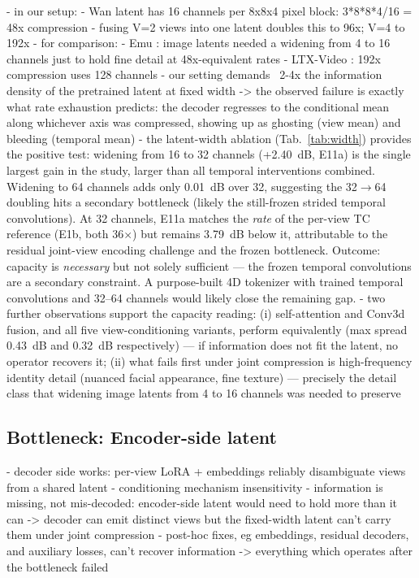 - in our setup:
    - Wan latent has 16 channels per 8x8x4 pixel block: 3*8*8*4/16 = 48x compression
    - fusing V=2 views into one latent doubles this to 96x; V=4 to 192x
- for comparison:
    - Emu \cite{dai2023emu}: image latents needed a widening from 4 to 16 channels just to hold fine detail at 48x-equivalent rates
    - LTX-Video \cite{hacohen2024ltx}: 192x compression uses 128 channels
- our setting demands ~2-4x the information density of the pretrained latent at fixed width -> the observed failure is exactly what rate exhaustion predicts: the decoder regresses to the conditional mean along whichever axis was compressed, showing up as ghosting (view mean) and bleeding (temporal mean)
- the latent-width ablation (Tab.~\ref{tab:width}) provides the positive test: widening from 16 to 32 channels (+2.40~dB, E11a) is the single largest gain in the study, larger than all temporal interventions combined. Widening to 64 channels adds only 0.01~dB over 32, suggesting the 32$\to$64 doubling hits a secondary bottleneck (likely the still-frozen strided temporal convolutions). At 32 channels, E11a matches the \emph{rate} of the per-view TC reference (E1b, both 36$\times$) but remains 3.79~dB below it, attributable to the residual joint-view encoding challenge and the frozen bottleneck. Outcome: capacity is \emph{necessary} but not solely sufficient --- the frozen temporal convolutions are a secondary constraint. A purpose-built 4D tokenizer with trained temporal convolutions and 32--64 channels would likely close the remaining gap.
- two further observations support the capacity reading: (i) self-attention and Conv3d fusion, and all five view-conditioning variants, perform equivalently (max spread 0.43~dB and 0.32~dB respectively) --- if information does not fit the latent, no operator recovers it; (ii) what fails first under joint compression is high-frequency identity detail (nuanced facial appearance, fine texture) --- precisely the detail class that widening image latents from 4 to 16 channels was needed to preserve \cite{dai2023emu}

\subsection{Bottleneck: Encoder-side latent}

- decoder side works: per-view LoRA + embeddings reliably disambiguate views from a shared latent
- conditioning mechanism insensitivity
- information is missing, not mis-decoded: encoder-side latent would need to hold more than it can
-> decoder can emit distinct views but the fixed-width latent can't carry them under joint compression
- post-hoc fixes, eg embeddings, residual decoders, and auxiliary losses, can't recover information -> everything which operates after the bottleneck failed

